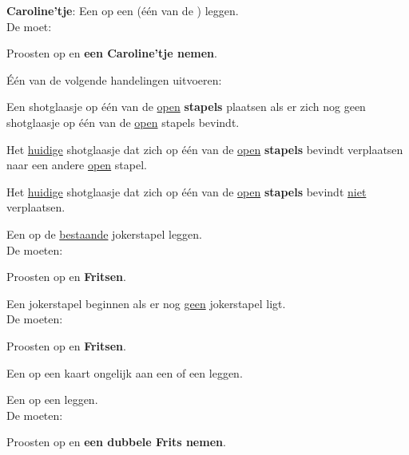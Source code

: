 \vervolgLijstKlein{}
\item \textbf{Caroline'tje}: Een  op een  (\'e\'en van de ) leggen. \\De \huidigeSpeler moet:
\puntLijst{}
\item Proosten op  en \textbf{een Caroline'tje nemen}\footnotemark[3].
\item Één van de volgende handelingen uitvoeren:
\numeriekeLijst{}
\item Een shotglaasje op \'e\'en van de \ul{open} \textbf{stapels} plaatsen als er zich nog geen shotglaasje op \'e\'en van de \ul{open} stapels bevindt.
\item Het \ul{huidige} shotglaasje dat zich op \'e\'en van de \ul{open} \textbf{stapels} bevindt verplaatsen naar een andere \ul{open} stapel.
\item Het \ul{huidige} shotglaasje dat zich op \'e\'en van de \ul{open} \textbf{stapels} bevindt \ul{niet} verplaatsen.
\eindNumeriekeLijst{}
\eindPuntLijst{}
\label{zet:caroline}
\eindLijst{}

\vervolgLijstKlein{}
\item \label{zet:joker_1} Een  op de \ul{bestaande} jokerstapel leggen. \\De \andereSpelers moeten:
\puntLijst{}
\item Proosten op  en \textbf{Fritsen}.
\eindPuntLijst{}
\eindLijst{}

\vervolgLijstKlein{}
\item \label{zet:joker_2} Een jokerstapel beginnen als er nog \ul{geen} jokerstapel ligt. \\De \andereSpelers moeten:
\puntLijst{}
\item Proosten op  en \textbf{Fritsen}.
\eindPuntLijst{}
\eindLijst{}

\vervolgLijstKlein{}
\item Een  op een kaart ongelijk aan een  of een  leggen.
\eindLijst{}

\vervolgLijstKlein{}
\item Een  op een  leggen. \\De \andereSpelers moeten:
\puntLijst{}
\item Proosten op  en \textbf{een dubbele Frits nemen}.
\eindPuntLijst{}
\eindLijst{}




